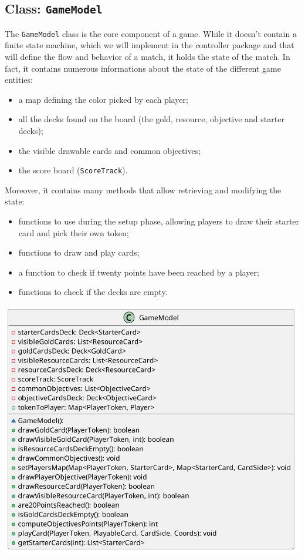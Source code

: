 \documentclass{article}
\begin{document}
\subsection[1]{Class: \texttt{GameModel}}
The \texttt{GameModel} class is the core component of a game.
While it doesn't contain a finite state machine, which we will implement in the controller package and that will define the flow and behavior of a match, it holds the state of the match.
In fact, it contains numerous informations about the state of the different game entities:
\begin{itemize}
    \item a map defining the color picked by each player;
    \item all the decks found on the board (the gold, resource, objective and starter decks);
    \item the visible drawable cards and common objectives;
    \item the score board (\texttt{ScoreTrack}).
\end{itemize}
Moreover, it contains many methods that allow retrieving and modifying the state:
\begin{itemize}
    \item functions to use during the setup phase, allowing players to draw their starter card and pick their own token;
    \item functions to draw and play cards;
    \item a function to check if twenty points have been reached by a player;
    \item functions to check if the decks are empty.
\end{itemize}

\vspace{1cm}
\begin{center}
    \includegraphics[scale=0.25]{pngs/GameModel}
\end{center}
\end{document}
